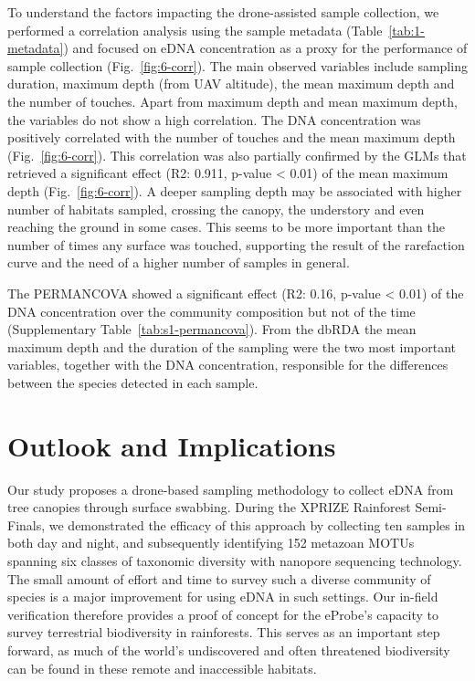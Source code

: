To understand the factors impacting the drone-assisted sample collection, we performed a correlation analysis using the sample metadata (Table~\ref{tab:1-metadata}) and focused on \gls{eDNA} concentration as a proxy for the performance of sample collection (Fig.~\ref{fig:6-corr}). The main observed variables include sampling duration, maximum depth (from UAV altitude), the mean maximum depth and the number of touches. Apart from maximum depth and mean maximum depth, the variables do not show a high correlation. The DNA concentration was positively correlated with the number of touches and the mean maximum depth (Fig.~\ref{fig:6-corr}). This correlation was also partially confirmed by the \glspl{GLM} that retrieved a significant effect (R2: 0.911, p-value < 0.01) of the mean maximum depth (Fig.~\ref{fig:6-corr}). A deeper sampling depth may be associated with higher number of habitats sampled, crossing the canopy, the understory and even reaching the ground in some cases. This seems to be more important than the number of times any surface was touched, supporting the result of the rarefaction curve and the need of a higher number of samples in general.

The PERMANCOVA showed a significant effect (R2: 0.16, p-value < 0.01) of the DNA concentration over the community composition but not of the time (Supplementary Table~\ref{tab:s1-permancova}). From the dbRDA the mean maximum depth and the duration of the sampling were the two most important variables, together with the DNA concentration, responsible for the differences between the species detected in each sample.

\section{Outlook and Implications}
\label{sec:outlook}

Our study proposes a drone-based sampling methodology to collect \gls{eDNA} from tree canopies through surface swabbing. During the XPRIZE Rainforest Semi-Finals, we demonstrated the efficacy of this approach by collecting ten samples in both day and night, and subsequently identifying 152 metazoan \glspl{MOTU} spanning six classes of taxonomic diversity with nanopore sequencing technology. The small amount of effort and time to survey such a diverse community of species is a major improvement for using eDNA in such settings. Our in-field verification therefore provides a proof of concept for the eProbe’s capacity to survey terrestrial biodiversity in rainforests. This serves as an important step forward, as much of the world's undiscovered and often threatened biodiversity can be found in these remote and inaccessible habitats.

